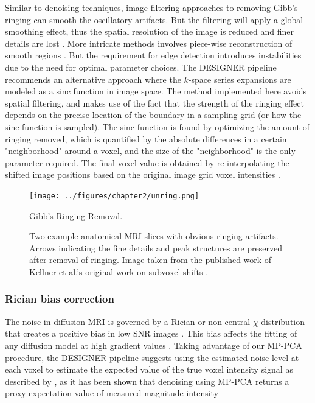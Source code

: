Similar to denoising techniques, image filtering approaches to removing Gibb's ringing can smooth the oscillatory artifacts. But the filtering will apply a global smoothing effect, thus the spatial resolution of the image is reduced and finer details are lost \cite{gottlieb_gibbs_1997,jerri_lanczos-like_2000}. More intricate methods involves piece-wise reconstruction of smooth regions \cite{gottlieb_gibbs_1997,archibald_method_2002}. But the requirement for edge detection introduces instabilities due to the need for optimal parameter choices. The DESIGNER pipeline recommends an alternative approach where the $k$-space series expansions are modeled as a sinc function in image space. The method implemented here avoids spatial filtering, and makes use of the fact that the strength of the ringing effect depends on the precise location of the boundary in a sampling grid (or how the sinc function is sampled). The sinc function is found by optimizing the amount of ringing removed, which is quantified by the absolute differences in a certain "neighborhood" around a voxel, and the size of the "neighborhood" is the only parameter required. The final voxel value is obtained by re-interpolating the shifted image positions based on the original image grid voxel intensities \cite{kellner_gibbs-ringing_2016}.

\begin{figure}[htbp]
    \centering
    \texttt{[image: ../figures/chapter2/unring.png]}
    \caption{Gibb's Ringing Removal.}
    \caption*{Two example anatomical MRI slices with obvious ringing artifacts. Arrows indicating the fine details and peak structures are preserved after removal of ringing. Image taken from the published work of Kellner et al.'s original work on subvoxel shifts \cite{kellner_gibbs-ringing_2016}.}
    \label{fig:unring}
\end{figure}

\subsubsection{Rician bias correction}
The noise in diffusion MRI is governed by a Rician or non-central $\chi$ distribution that creates a positive bias in low SNR images \cite{gudbjartsson_rician_1995}. This bias affects the fitting of any diffusion model at high gradient values \cite{gudbjartsson_rician_1995}. Taking advantage of our MP-PCA procedure, the DESIGNER pipeline suggests using the estimated noise level at each voxel to estimate the expected value of the true voxel intensity signal as described by \cite{koay_analytically_2006}, as it has been shown that denoising using MP-PCA returns a proxy expectation value of measured magnitude intensity \cite{veraart_denoising_2016}

